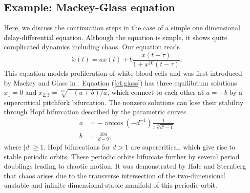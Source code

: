 \documentclass[10pt,a4paper]{ddedoc}
\begin{document}
\subsection{Example: Mackey-Glass equation}

Here, we discuss the continuation steps in the case of a simple one dimensional
delay-differential equation. Although the equation is simple, it shows quite
complicated dynamics including chaos. Our equation reads
\begin{equation}
  \dot{x} ( t ) = ax ( t ) + b \frac{x ( t - \tau )}{1 + x^{10} ( t - \tau )}.
\label{ct:glass}
\end{equation}
This equation models proliferation of white blood cells and was first
introduced by Mackey and Glass in {\cite{mackey}}. Equation (\ref{ct:glass})
has three equilibrium solutions $x_1 = 0$ and $x_{2, 3} = \sqrt[10]{- ( a + b
) / a}$, which connect to each other at $a = - b$ by a supercritical pitchfork
bifurcation. The nonzero solutions can lose their stability through Hopf
bifurcation described by the parametric curves
\begin{align*}
  a & =-\arccos(-d^{-1}){\frac{1}{{\tau} {\sqrt[10]{d^2-1}}}}\\
  b & ={\frac{10a}{d-9}},
\end{align*}
where $|d| \ge 1$. Hopf bifurcations for $d > 1$ are supercritical, which give
rise to stable periodic orbits. These periodic orbits bifurcate further by
several period doublings leading to chaotic motion. It was demonstrated by
Hale and Sternberg {\cite{sternberg}} that chaos arises due to the transverse
intersection of the two-dimensional unstable and infinite dimensional stable
manifold of this periodic orbit.
\end{document}
